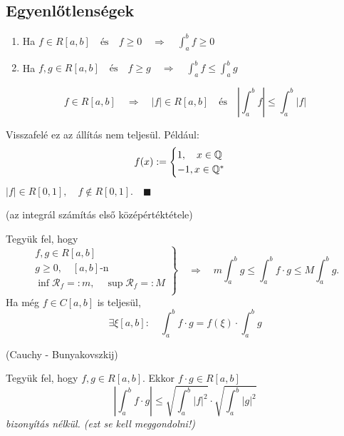 \documentclass[a4paper,11.5pt]{article}
\begin{document}
	\subsection{Egyenlőtlenségek}
	\begin{theorem}
		\begin{enumerate}\
			
			\item Ha $f\in R[a,b]\quad \text{és}\quad f\geq0\quad \Rightarrow\quad \int_a^bf\geq0$
			\item Ha $f,g\in R[a,b]\quad \text{és}\quad f\geq g\quad \Rightarrow\quad \int_a^bf\leq\int_a^bg$
		\end{enumerate}
	\end{theorem}
	\begin{theorem}
		\[f\in R[a,b]\quad \Rightarrow\quad |f|\in R[a,b]\quad \text{és}\quad \left|\int_a^bf\right|\leq\int_a^b\left|f\right| \]
	\end{theorem}
	\begin{note}
		Visszafelé ez az állítás nem teljesül. Például:
		\[ f(x):=\begin{cases}
			1,\quad x\in\mathbb{Q}\\
			-1, x\in\mathbb{Q}^*
		\end{cases} \]
		$|f|\in R[0,1],\quad f\notin R[0,1].\quad \blacksquare$
	\end{note}
	\begin{theorem}
		(az integrál számítás első középértéktétele)
		
		Tegyük fel, hogy 
		\[ \left.\begin{gathered}
			f,g\in R[a,b]\\
			g\geq 0,\quad [a,b]\text{-n}\\
			\inf\mathcal{R}_f=:m,\quad \sup\mathcal{R}_f=:M\\
		\end{gathered}\right\}\quad \Rightarrow\quad m\int_a^bg\leq\int_a^bf\cdot g\leq M\int_a^bg.\]
		Ha még $f\in C[a,b]$ is teljesül,
		\[ \exists\xi[a,b]:\quad \int_a^bf\cdot g=f(\xi)\cdot\int_a^bg \]
	\end{theorem}
	\begin{theorem}
		(Cauchy - Bunyakovszkij)
		
		Tegyük fel, hogy $f,g\in R[a,b]$. Ekkor $f\cdot g\in R[a,b]$
		\[ \left|\int_a^bf\cdot g\right|\leq\sqrt{\int_a^b|f|^2}\cdot\sqrt{\int_a^b|g|^2} \]
		\textit{bizonyítás nélkül. (ezt se kell meggondolni!)}
	\end{theorem}
\end{document}
